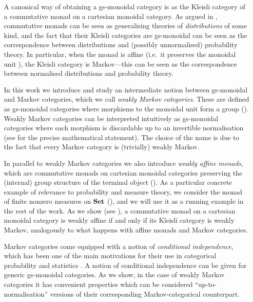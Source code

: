 \documentclass[a4paper,UKenglish,numberwithinsect,cleveref, autoref, thm-restate]{lipics-v2021}
\theoremstyle{plain} %
\theoremstyle{definition} %
\begin{document}
A canonical way of obtaining a gs-monoidal category is as the Kleisli category of a commutative monad on a cartesian monoidal category. 
As argued in \cite{kock2012distributions}, commutative monads can be seen as generalising theories of \emph{distributions} of some kind, and the fact that their Kleisli categories are gs-monoidal can be seen as the correspondence between distributions and (possibly unnormalised) probability theory.
In particular, when the monad is affine (i.e.~it preserves the monoidal unit \cite{Kock71,Jacobs1994}), the Kleisli category is Markov---this can be seen as the correspondence between normalised distributions and probability theory.

In this work we introduce and study an intermediate notion between gs-monoidal and Markov categories, which we call \emph{weakly Markov categories}. 
These are defined as gs-monoidal categories where morphisms to the monoidal unit form a group (). 
Weakly Markov categories can be interpreted intuitively as gs-monoidal categories where each morphism is discardable up to an invertible normalisation (see  for the precise mathematical statement). The choice of the name is due to the fact that every Markov category is (trivially) weakly Markov.

In parallel to weakly Markov categories we also introduce \emph{weakly affine monads}, which are commutative monads on cartesian monoidal categories preserving the (internal) group structure of the terminal object ().
As a particular concrete example of relevance to probability and measure theory, we consider the monad of finite nonzero measures on $\mathbf{Set}$ (), and we will use it as a running example in the rest of the work.
As we show (see ), a commutative monad on a cartesian monoidal category is weakly affine if and only if its Kleisli category is weakly Markov, analogously to what happens with affine monads and Markov categories. 

Markov categories come equipped with a notion of \emph{conditional independence}, which has been one of the main motivations for their use in categorical probability and statistics \cite{cho_jacobs_2019,Fritz_2020,fritz2022dseparation}.
A notion of conditional independence can be given for generic gs-monoidal categories. As we show, in the case of weakly Markov categories it has convenient properties which can be considered ``up-to-normalisation'' versions of their corresponding Markov-categorical counterpart.
\end{document}
